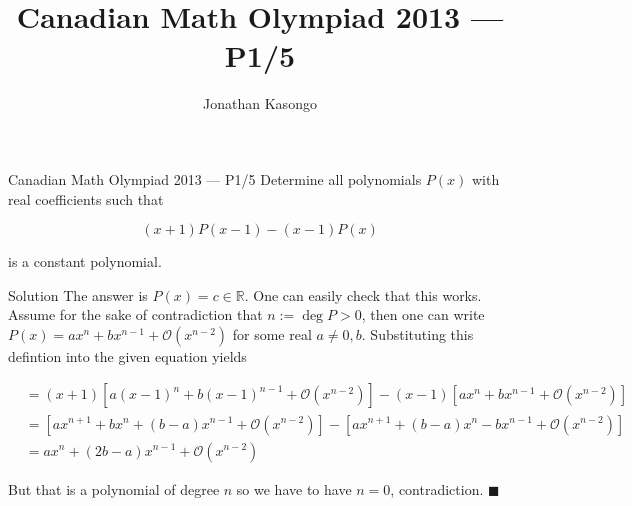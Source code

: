 \documentclass{article}
\author{Jonathan Kasongo}
\title{Canadian Math Olympiad 2013 --- P1/5}
\begin{document}
\maketitle

\begin{problem}{Canadian Math Olympiad 2013 --- P1/5}
Determine all polynomials $P(x)$ with real coefficients such that

$$
(x+1)P(x-1) - (x-1)P(x)
$$

is a constant polynomial.
\end{problem}

\begin{solution}{Solution}
The answer is $P(x) = c \in \mathbb{R}$. One can easily check that this
works. Assume for the sake of contradiction that $n := \deg P > 0$, then
one can write $P(x) = ax^n + bx^{n-1} + \mathcal{O}(x^{n-2})$ for some
real $a\neq 0, b$. Substituting this defintion into the given equation
yields

\[
\begin{aligned}
&= (x+1)\left[a(x-1)^n + b(x-1)^{n-1} + \mathcal{O}(x^{n-2})\right] -
(x-1)\left[ax^n + bx^{n-1} + \mathcal{O}(x^{n-2})\right] \\
&= \left[ ax^{n+1} + bx^n + (b-a)x^{n-1} + \mathcal{O}(x^{n-2}) \right] -
\left[ ax^{n+1} + (b-a)x^n - bx^{n-1} + \mathcal{O}(x^{n-2})\right] \\
&= ax^n + (2b-a)x^{n-1} + \mathcal{O}(x^{n-2})
\end{aligned}
\]

But that is a polynomial of degree $n$ so we have to have $n=0$,
contradiction. $\blacksquare$
\end{solution}
\end{document}
